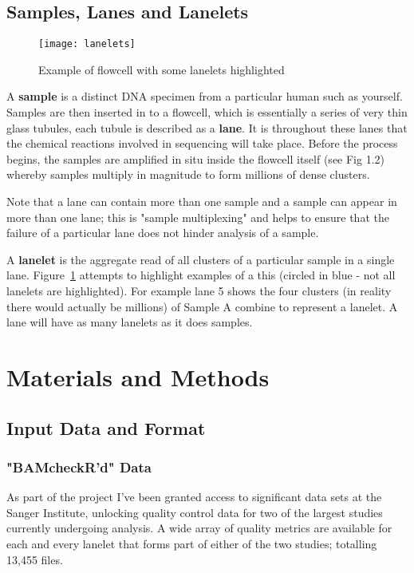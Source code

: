 \subsection{Samples, Lanes and Lanelets}

\begin{figure}[htbp!]
    \centering
    \texttt{[image: lanelets]}
    \caption[lanelets]{Example of flowcell with some lanelets highlighted}
    \label{fig:lanelets}
\end{figure}
A \textbf{sample} is a distinct DNA specimen from a particular human such as
yourself. Samples are then inserted in to a flowcell, which is essentially a
series of very thin glass tubules, each tubule is described as a \textbf{lane}.
It is throughout these lanes that the chemical reactions involved in sequencing
will take place. Before the process begins, the samples are amplified in situ
inside the flowcell itself (see Fig 1.2) whereby samples multiply in magnitude
to form millions of dense clusters.

Note that a lane can contain more than one sample and a sample can appear in
more than one lane; this is "sample multiplexing" and helps to ensure that the
failure of a particular lane does not hinder analysis of a sample.

A \textbf{lanelet} is the aggregate read of all clusters of a particular sample
in a single lane. Figure~\ref{fig:lanelets} attempts to highlight examples of a
this (circled in blue - not all lanelets are highlighted). For example lane 5
shows the four clusters (in reality there would actually be millions) of Sample
A combine to represent a lanelet. A lane will have as many lanelets as it does
samples.


\section{Materials and Methods}
\subsection{Input Data and Format}
\subsubsection{"BAMcheckR'd" Data}

As part of the project I've been granted access to significant data sets at the
Sanger Institute, unlocking quality control data for two of the largest studies
currently undergoing analysis. A wide array of quality metrics are available for
each and every lanelet that forms part of either of the two studies; totalling
13,455 files.

